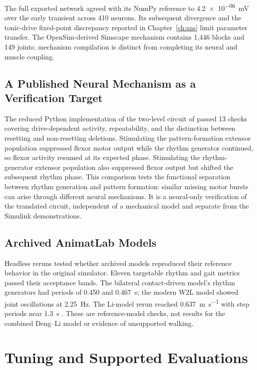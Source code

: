 The full exported network agreed with its NumPy reference to \qty{4.2e-06}{\milli\volt} over the early transient across 410 neurons. Its subsequent divergence and the tonic-drive fixed-point discrepancy reported in Chapter~\ref{ch:sns} limit parameter transfer. The OpenSim-derived Simscape mechanism contains 1,446 blocks and 149 joints; mechanism compilation is distinct from completing its neural and muscle coupling.

\subsection{A Published Neural Mechanism as a Verification Target}\label{sec:rybak_verification}

The reduced Python implementation of the two-level circuit of \citet{rybak_modelling_2006} passed 13 checks covering drive-dependent activity, repeatability, and the distinction between resetting and non-resetting deletions. Stimulating the pattern-formation extensor population suppressed flexor motor output while the rhythm generator continued, so flexor activity resumed at its expected phase. Stimulating the rhythm-generator extensor population also suppressed flexor output but shifted the subsequent rhythm phase. This comparison tests the functional separation between rhythm generation and pattern formation: similar missing motor bursts can arise through different neural mechanisms. It is a neural-only verification of the translated circuit, independent of a mechanical model and separate from the Simulink demonstrations.

\subsection{Archived AnimatLab Models}\label{sec:animatlab_validation}

Headless reruns tested whether archived models reproduced their reference behavior in the original simulator. Eleven targetable rhythm and gait metrics passed their acceptance bands. The bilateral contact-driven model's rhythm generators had periods of \qty{0.450}{} and \qty{0.467}{\second}; the modern W2L model showed joint oscillations at \qty{2.25}{\Hz}. The Li-model rerun reached \qty{0.637}{\meter\per\second} with step periods near \qty{1.3}{\second} \citep{li_bipedal_2017}. These are reference-model checks, not results for the combined Deng--Li model or evidence of unsupported walking.

\section{Tuning and Supported Evaluations}\label{sec:sns_tuning_methods}\label{sec:sns_curriculum}

